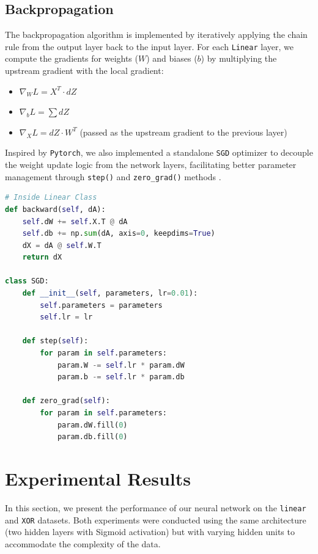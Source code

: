 \documentclass[10pt,twocolumn,letterpaper]{article}
\begin{document}
\subsection{Backpropagation}
The backpropagation algorithm is implemented by iteratively applying the chain rule from the output layer back to the input layer. For each \texttt{Linear} layer, we compute the gradients for weights ($W$) and biases ($b$) by multiplying the upstream gradient with the local gradient:
\begin{itemize}
    \item $\nabla_W L = X^T \cdot dZ$
    \item $\nabla_b L = \sum dZ$
    \item $\nabla_X L = dZ \cdot W^T$ (passed as the upstream gradient to the previous layer)
\end{itemize}
Inspired by \texttt{Pytorch}, we also implemented a standalone \texttt{SGD} optimizer to decouple the weight update logic from the network layers, facilitating better parameter management through \texttt{step()} and \texttt{zero\_grad()} methods .

\begin{lstlisting}[language=Python]
# Inside Linear Class
def backward(self, dA):
    self.dW += self.X.T @ dA 
    self.db += np.sum(dA, axis=0, keepdims=True)
    dX = dA @ self.W.T 
    return dX

class SGD:
    def __init__(self, parameters, lr=0.01):
        self.parameters = parameters
        self.lr = lr

    def step(self):
        for param in self.parameters:
            param.W -= self.lr * param.dW
            param.b -= self.lr * param.db

    def zero_grad(self):
        for param in self.parameters:
            param.dW.fill(0)
            param.db.fill(0)
\end{lstlisting}


\section{Experimental Results} \label{sec:exp}

In this section, we present the performance of our neural network on the \texttt{linear} and \texttt{XOR} datasets. Both experiments were conducted using the same architecture (two hidden layers with Sigmoid activation) but with varying hidden units to accommodate the complexity of the data.
\end{document}
